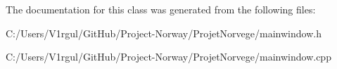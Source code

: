 The documentation for this class was generated from the following files\-:\begin{DoxyCompactItemize}
\item 
C\-:/\-Users/\-V1rgul/\-Git\-Hub/\-Project-\/\-Norway/\-Projet\-Norvege/mainwindow.\-h\item 
C\-:/\-Users/\-V1rgul/\-Git\-Hub/\-Project-\/\-Norway/\-Projet\-Norvege/mainwindow.\-cpp\end{DoxyCompactItemize}
